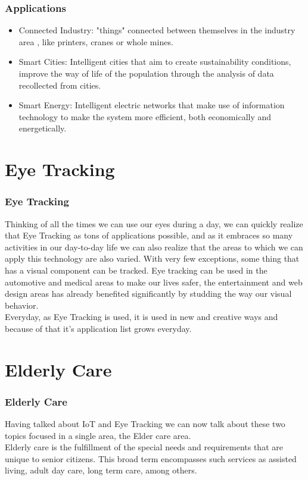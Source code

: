 \documentclass{beamer}
\begin{document}
\begin{frame}
\frametitle{Applications}
\begin{itemize}
\item Connected Industry: "things" connected between themselves in the industry area , like printers, cranes or whole mines.
\item Smart Cities: Intelligent cities that aim to create sustainability conditions, improve the way of life of the population through the analysis of data recollected from cities. 
\item Smart Energy: Intelligent electric networks that make use of information technology to make the system more efficient, both economically and energetically.
\end{itemize}
\end{frame}


\section{Eye Tracking}

\begin{frame}
\frametitle{Eye Tracking}
Thinking of all the times we can use our eyes during a day, we can quickly realize that Eye Tracking as tons of applications possible, and as it embraces so many activities in our day-to-day life we can also realize that the areas to which we can apply this technology are also varied. With very few exceptions, some thing that has a visual component can be tracked. Eye tracking can be used in the automotive and medical areas to make our lives safer, the entertainment and web design areas has already benefited significantly by studding the way our visual behavior. \\ 
Everyday, as Eye Tracking is used, it is used in new and creative ways and because of that it's application list grows everyday.
\end{frame}


\section{Elderly Care}

\begin{frame}
\frametitle{Elderly Care}
Having talked about IoT and Eye Tracking we can now talk about these two topics focused in a single area, the Elder care area. \\
Elderly care is the fulfillment of the special needs and requirements that are unique to senior citizens. This broad term encompasses such services as assisted living, adult day care, long term care, among others.
\end{frame}
\end{document}
